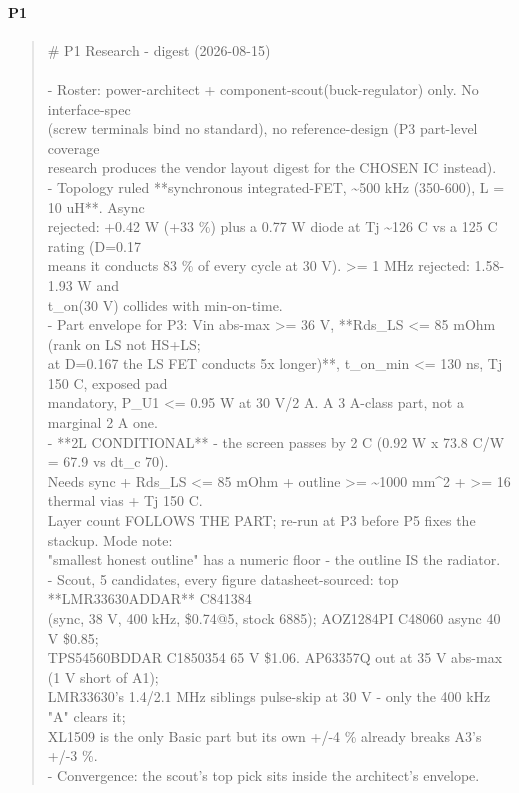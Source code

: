\documentclass[11pt,a4paper]{article}
\begin{document}
\paragraph*{P1}
\begin{quote}\small\ttfamily\raggedright
\# P1 Research - digest (2026-08-15)\\
~\\
- Roster: power-architect + component-scout(buck-regulator) only. No interface-spec\\
  (screw terminals bind no standard), no reference-design (P3 part-level coverage\\
  research produces the vendor layout digest for the CHOSEN IC instead).\\
- Topology ruled {*}{*}synchronous integrated-FET, \textasciitilde{}500 kHz (350-600), L = 10 uH{*}{*}. Async\\
  rejected: +0.42 W (+33 \%) plus a 0.77 W diode at Tj \textasciitilde{}126 C vs a 125 C rating (D=0.17\\
  means it conducts 83 \% of every cycle at 30 V). \textgreater{}= 1 MHz rejected: 1.58-1.93 W and\\
  t\_on(30 V) collides with min-on-time.\\
- Part envelope for P3: Vin abs-max \textgreater{}= 36 V, {*}{*}Rds\_LS \textless{}= 85 mOhm (rank on LS not HS+LS;\\
  at D=0.167 the LS FET conducts 5x longer){*}{*}, t\_on\_min \textless{}= 130 ns, Tj 150 C, exposed pad\\
  mandatory, P\_U1 \textless{}= 0.95 W at 30 V/2 A. A 3 A-class part, not a marginal 2 A one.\\
- {*}{*}2L CONDITIONAL{*}{*} - the screen passes by 2 C (0.92 W x 73.8 C/W = 67.9 vs dt\_c 70).\\
  Needs sync + Rds\_LS \textless{}= 85 mOhm + outline \textgreater{}= \textasciitilde{}1000 mm\textasciicircum{}2 + \textgreater{}= 16 thermal vias + Tj 150 C.\\
  Layer count FOLLOWS THE PART; re-run at P3 before P5 fixes the stackup. Mode note:\\
  "smallest honest outline" has a numeric floor - the outline IS the radiator.\\
- Scout, 5 candidates, every figure datasheet-sourced: top {*}{*}LMR33630ADDAR{*}{*} C841384\\
  (sync, 38 V, 400 kHz, \$0.74@5, stock 6885); AOZ1284PI C48060 async 40 V \$0.85;\\
  TPS54560BDDAR C1850354 65 V \$1.06. AP63357Q out at 35 V abs-max (1 V short of A1);\\
  LMR33630's 1.4/2.1 MHz siblings pulse-skip at 30 V - only the 400 kHz "A" clears it;\\
  XL1509 is the only Basic part but its own +/-4 \% already breaks A3's +/-3 \%.\\
- Convergence: the scout's top pick sits inside the architect's envelope.
\end{quote}
\end{document}
